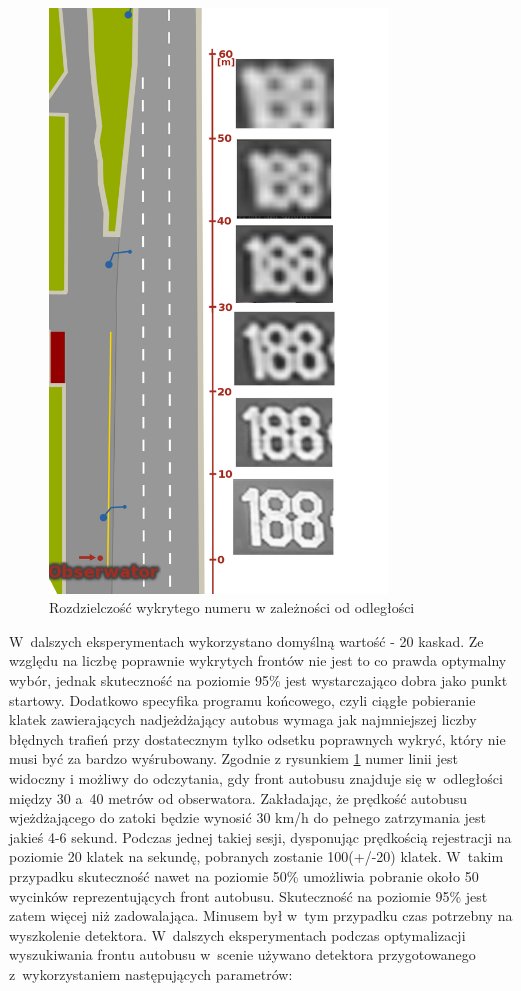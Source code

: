 \begin{figure}[!h]
	\centering
	\includegraphics[width=0.8\textwidth]{img/exp_numer_od_odleglosci}
	\caption{Rozdzielczość wykrytego numeru w zależności od odległości}
	\label{fig:dist2res}
\end{figure}

W~dalszych eksperymentach wykorzystano domyślną wartość - 20 kaskad. Ze względu
na liczbę poprawnie wykrytych frontów nie jest to co prawda optymalny wybór,
jednak skuteczność na poziomie 95\% jest wystarczająco dobra jako punkt startowy. Dodatkowo
specyfika programu końcowego, czyli ciągłe pobieranie klatek zawierających
nadjeżdżający autobus wymaga jak najmniejszej liczby błędnych trafień przy 
dostatecznym tylko odsetku poprawnych wykryć, który nie musi być za bardzo wyśrubowany.
Zgodnie z rysunkiem \ref{fig:dist2res}
numer linii jest widoczny i możliwy do odczytania, gdy front autobusu znajduje 
się w~odległości
między 30 a~40 metrów od obserwatora. Zakładając, że prędkość autobusu wjeżdżającego
do zatoki będzie wynosić 30 km/h do pełnego zatrzymania jest jakieś 4-6 sekund. 
Podczas jednej
takiej sesji, dysponując prędkością rejestracji na poziomie 20 klatek na sekundę, 
pobranych
zostanie 100(+/-20) klatek. W~takim przypadku skuteczność nawet na poziomie 50\% 
umożliwia pobranie około 50 wycinków reprezentujących front autobusu. 
Skuteczność na poziomie
95\% jest zatem więcej niż zadowalająca. Minusem był w~tym przypadku czas potrzebny
na wyszkolenie detektora. W~dalszych eksperymentach podczas optymalizacji wyszukiwania
frontu autobusu w~scenie używano detektora przygotowanego z~wykorzystaniem następujących 
parametrów:


